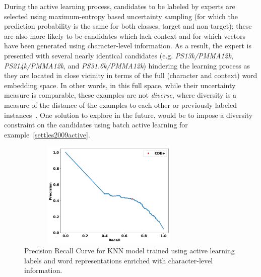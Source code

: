 During the active learning process, candidates to be labeled by experts are selected using maximum-entropy based uncertainty sampling (for which the prediction probability is the same for both classes, target and non target);
these are also more likely to be candidates which lack context and for which vectors have been generated using character-level information. 
As a result, the expert is presented with several nearly identical candidates (e.g. \textit{PS13k/PMMA12k}, \textit{PS214k/PMMA12k}, and \textit{PS31.6k/PMMA12k}) hindering the learning process as they are located in close vicinity in terms of the full (character and context) word embedding space.
In other words, in this full space, while their uncertainty measure is comparable, these examples are not \textit{diverse}, where diversity is a measure of the distance of the examples to each other or previously labeled instances~\cite{brinker2003incorporating}.
One solution to explore in the future, would be to impose a diversity constraint on the candidates using batch active learning for example~\ref{settles2009active}.


\begin{figure}
\centering
\includegraphics[trim=0in 0.1in 0.1in 0.in,clip,width=3.5in,height=2in]{figures/fasttext_prc_al_corpus_round5_100}
\caption{Precision Recall Curve for KNN model trained using active learning labels and word representations enriched with character-level information.}\label{fig:UBS_prcs_fasttext}
\end{figure}











